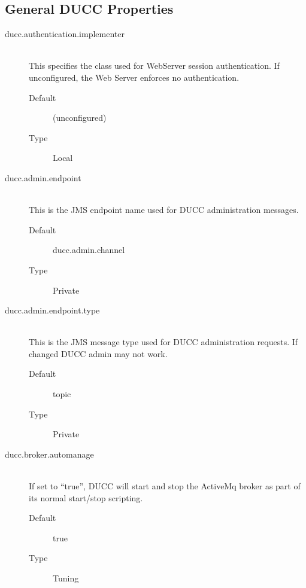\subsection{General DUCC Properties}
    \begin{description}

       \item[ducc.authentication.implementer] \hfill \\
         This specifies the class used for WebServer session authentication.  If unconfigured,
         the Web Server enforces no authentication.
         \begin{description}
           \item[Default] (unconfigured)
           \item[Type] Local
         \end{description}

       \item[ducc.admin.endpoint] \hfill \\
         This is the JMS endpoint name used for DUCC administration messages. 
         \begin{description}
           \item[Default] ducc.admin.channel 
           \item[Type] Private 
         \end{description}

       \item[ducc.admin.endpoint.type] \hfill \\
         This is the JMS message type used for DUCC administration requests. If changed DUCC 
         admin may not work. 
         \begin{description}
           \item[Default] topic 
           \item[Type] Private
         \end{description} 
           
       \item[ducc.broker.automanage] \hfill \\
         If set to ``true'', DUCC will start and stop the ActiveMq broker as part of its normal start/stop
         scripting.  
         \begin{description}
           \item[Default] true
           \item[Type] Tuning
         \end{description} 


\end{description}
